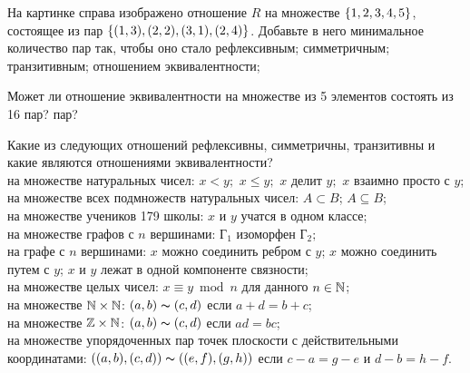 \documentclass[a4paper,12pt]{article}
\begin{document}
На картинке справа изображено отношение $R$ на множестве $\left\{1,2,3,4,5\right\}$,
состоящее из пар $\left\{(1,3), (2,2), (3,1), (2,4)\right\}$.
Добавьте в него минимальное количество пар так, чтобы оно стало
 рефлексивным;
 симметричным;
 транзитивным;
 отношением эквивалентности;

 Может ли отношение эквивалентности на множестве из 5 элементов состоять из 16 пар?
 пар?

\label{main}
Какие из следующих отношений рефлексивны, симметричны, транзитивны  и какие являются
отношениями эквивалентности?\\
на множестве   натуральных чисел:
$x<y;$  $x \le y;$ $x$ делит $y;$ $x$ взаимно просто с $y$;\\ %
на множестве всех подмножеств натуральных чисел: $A \subset B$; $A \subseteq B$; \\
 на множестве учеников 179 школы: $x$ и $y$ учатся в одном классе;\\
 на множестве  графов с $n$ вершинами: $Г_1$ изоморфен $Г_2;$\\
 на графе с $n$ вершинами: $x$ можно соединить ребром с $y$; $x$ можно соединить путем с $y$; $x$ и $y$ лежат в одной компоненте связности;\\
 на множестве целых чисел: $x\equiv y \bmod n$ для данного $n\in\mathbb{N}$;\\
 на множестве $\mathbb{N}\times\mathbb{N}$: $(a,b)\thicksim(c,d)$ если $a+d=b+c$;\\
 на множестве $\mathbb{Z}\times\mathbb{N}$: $(a,b)\thicksim(c,d)$ если $ad=bc$;\\
 на множестве упорядоченных пар точек плоскости с действительными координатами: $((a,b),(c,d))\thicksim((e,f),(g,h))$ если $c-a=g-e$ и $d-b=h-f$.

\end{document}
